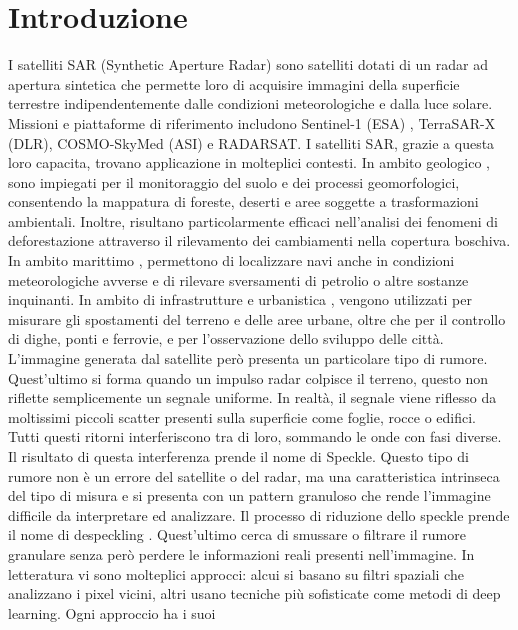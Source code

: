 
\chapter{Introduzione}
I satelliti SAR (Synthetic Aperture Radar) sono satelliti dotati di un radar ad apertura sintetica che permette
loro di acquisire immagini della superficie terrestre indipendentemente dalle 
condizioni meteorologiche e dalla luce solare. 
Missioni e piattaforme di riferimento includono Sentinel-1 (ESA) \cite{esa_sentinel1}, TerraSAR-X (DLR), 
COSMO-SkyMed (ASI) e RADARSAT.
I satelliti SAR, grazie a questa loro 
capacita, trovano applicazione in molteplici contesti. In ambito geologico \cite{nhess-20-2379-2020}, 
sono impiegati per il monitoraggio del suolo e dei processi 
geomorfologici, consentendo la mappatura di foreste, deserti e aree soggette a 
trasformazioni ambientali. Inoltre, risultano particolarmente efficaci nell’analisi 
dei fenomeni di deforestazione attraverso il rilevamento dei cambiamenti nella 
copertura boschiva. In ambito marittimo \cite{ESA_TrackingMaritimeTraffic}, permettono di localizzare navi anche in condizioni 
meteorologiche avverse e di rilevare sversamenti di petrolio o altre sostanze 
inquinanti. In ambito di infrastrutture e urbanistica \cite{esa_sentinel1}, vengono utilizzati per misurare gli 
spostamenti del terreno e delle aree urbane, oltre che per il controllo di dighe, 
ponti e ferrovie, e per l’osservazione dello sviluppo delle città. 
L'immagine generata dal satellite però presenta un particolare tipo di rumore. Quest'ultimo si forma quando un impulso radar colpisce il terreno, 
questo non riflette semplicemente un segnale uniforme. In realtà, il segnale viene riflesso da 
moltissimi piccoli scatter presenti sulla superficie come foglie, rocce o edifici. 
Tutti questi ritorni interferiscono tra di loro, sommando le onde con fasi diverse. Il risultato di questa 
interferenza prende il nome di Speckle. Questo tipo di rumore non è un errore del satellite o 
del radar, ma una caratteristica intrinseca del tipo di misura e si presenta con un pattern granuloso
che rende l'immagine difficile da interpretare ed analizzare.
Il processo di riduzione dello speckle 
prende il nome di despeckling \cite{1097762}. Quest'ultimo cerca di smussare o filtrare il rumore granulare senza 
però perdere le informazioni reali presenti nell'immagine. In letteratura vi sono molteplici 
approcci: alcui si basano su filtri spaziali che analizzano i pixel vicini, altri usano tecniche 
più sofisticate come metodi di deep learning. Ogni approccio ha i suoi
